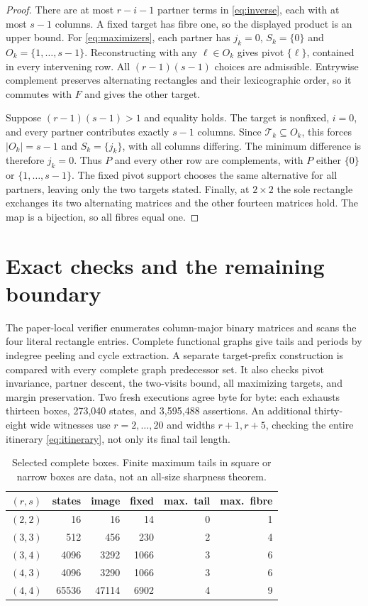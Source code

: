 \documentclass[a4paper,10pt]{amsart}
\theoremstyle{remark}
\begin{document}
\begin{proof}
There are at most $r-i-1$ partner terms in \eqref{eq:inverse}, each
with at most $s-1$ columns. A fixed target has fibre one, so the
displayed product is an upper bound. For \eqref{eq:maximizers}, each
partner has $j_k=0$, $S_k=\{0\}$ and $O_k=\{1,\ldots,s-1\}$.
Reconstructing with any $\ell\in O_k$ gives pivot $\{\ell\}$, contained
in every intervening row. All $(r-1)(s-1)$ choices are admissible.
Entrywise complement preserves alternating rectangles and their
lexicographic order, so it commutes with $F$ and gives the other target.

Suppose $(r-1)(s-1)>1$ and equality holds. The target is nonfixed,
$i=0$, and every partner contributes exactly $s-1$ columns.
Since $\mathcal T_k\subseteq O_k$, this forces $|O_k|=s-1$ and
$S_k=\{j_k\}$, with all columns differing. The minimum difference
is therefore $j_k=0$. Thus $P$ and every other row are complements,
with $P$ either $\{0\}$ or $\{1,\ldots,s-1\}$. The fixed pivot
support chooses the same alternative for all partners, leaving only
the two targets stated. Finally, at $2\times2$ the sole rectangle
exchanges its two alternating matrices and the other fourteen
matrices hold. The map is a bijection, so all fibres equal one.
\end{proof}

\section{Exact checks and the remaining boundary}

The paper-local verifier enumerates column-major binary matrices and
scans the four literal rectangle entries. Complete functional graphs
give tails and periods by indegree peeling and cycle extraction.
A separate target-prefix construction is compared with every complete
graph predecessor set. It also checks pivot invariance, partner descent,
the two-visits bound, all maximizing targets, and margin preservation.
Two fresh executions agree byte for byte: each exhausts thirteen boxes,
273,040 states, and 3,595,488 assertions. An additional thirty-eight
wide witnesses use $r=2,\ldots,20$ and widths $r+1,r+5$, checking the
entire itinerary \eqref{eq:itinerary}, not only its final tail length.

\begin{table}[ht]
\centering
\caption{Selected complete boxes. Finite maximum tails in square or
narrow boxes are data, not an all-size sharpness theorem.}
\label{tab:checks}
\begin{tabular}{c|r r r r r}
$(r,s)$&states&image&fixed&max.\ tail&max.\ fibre\\\hline
$(2,2)$&16&16&14&0&1\\
$(3,3)$&512&456&230&2&4\\
$(3,4)$&4096&3292&1066&3&6\\
$(4,3)$&4096&3290&1066&3&6\\
$(4,4)$&65536&47114&6902&4&9
\end{tabular}
\end{table}
\end{document}
